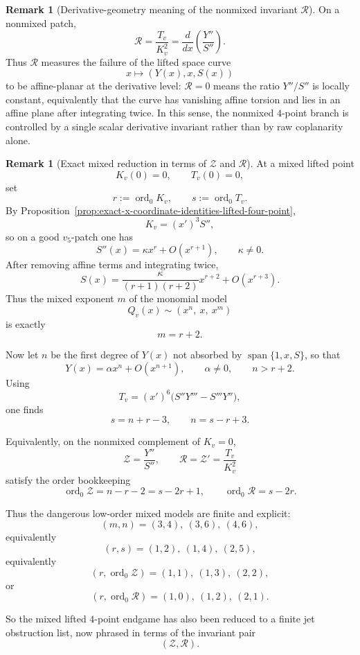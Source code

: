 \documentclass[11pt,a4paper]{amsart}
\theoremstyle{plain}
\theoremstyle{definition}
\newtheorem{remark}[theorem]{Remark}
\begin{document}
\begin{remark}[Derivative-geometry meaning of the nonmixed invariant $\mathcal R$]
\label{rem:derivative-geometry-meaning-of-R}
On a nonmixed patch,
\[
\mathcal R=\frac{T_v}{K_v^2}
=
\frac{d}{dx}\!\left(\frac{Y''}{S''}\right).
\]
Thus $\mathcal R$ measures the failure of the lifted space curve
\[
x\longmapsto (Y(x),x,S(x))
\]
to be affine-planar at the derivative level: $\mathcal R=0$ means the ratio
$Y''/S''$ is locally constant, equivalently that the curve has vanishing
affine torsion and lies in an affine plane after integrating twice. In this
sense, the nonmixed $4$-point branch is controlled by a single scalar
derivative invariant rather than by raw coplanarity alone.
\end{remark}

\begin{remark}[Exact mixed reduction in terms of $\mathcal Z$ and $\mathcal R$]
\label{rem:mixed-order-bookkeeping-no-generic-parity-obstruction}
At a mixed lifted point
\[
K_v(0)=0,
\qquad
T_v(0)=0,
\]
set
\[
r:=\operatorname{ord}_0 K_v,
\qquad
s:=\operatorname{ord}_0 T_v.
\]
By Proposition~\ref{prop:exact-x-coordinate-identities-lifted-four-point},
\[
K_v=(x')^3S'',
\]
so on a good $v_5$-patch one has
\[
S''(x)=\kappa x^r+O(x^{r+1}),
\qquad \kappa\neq 0.
\]
After removing affine terms and integrating twice,
\[
S(x)=\frac{\kappa}{(r+1)(r+2)}x^{r+2}+O(x^{r+3}).
\]
Thus the mixed exponent $m$ of the monomial model
\[
Q_v(x)\sim (x^n,\ x,\ x^m)
\]
is exactly
\[
m=r+2.
\]

Now let $n$ be the first degree of $Y(x)$ not absorbed by
$\operatorname{span}\{1,x,S\}$, so that
\[
Y(x)=\alpha x^n+O(x^{n+1}),
\qquad \alpha\neq 0,
\qquad n>r+2.
\]
Using
\[
T_v=(x')^6\bigl(S''Y'''-S'''Y''\bigr),
\]
one finds
\[
s=n+r-3,
\qquad
n=s-r+3.
\]

Equivalently, on the nonmixed complement of $K_v=0$,
\[
\mathcal Z=\frac{Y''}{S''},
\qquad
\mathcal R=\mathcal Z'=\frac{T_v}{K_v^2}
\]
satisfy the order bookkeeping
\[
\operatorname{ord}_0\mathcal Z=n-r-2=s-2r+1,
\qquad
\operatorname{ord}_0\mathcal R=s-2r.
\]

Thus the dangerous low-order mixed models are finite and explicit:
\[
(m,n)=(3,4),\ (3,6),\ (4,6),
\]
equivalently
\[
(r,s)=(1,2),\ (1,4),\ (2,5),
\]
equivalently
\[
(r,\operatorname{ord}_0\mathcal Z)=(1,1),\ (1,3),\ (2,2),
\]
or
\[
(r,\operatorname{ord}_0\mathcal R)=(1,0),\ (1,2),\ (2,1).
\]

So the mixed lifted $4$-point endgame has also been reduced to a finite jet
obstruction list, now phrased in terms of the invariant pair
\[
(\mathcal Z,\mathcal R).
\]
\end{remark}
\end{document}
